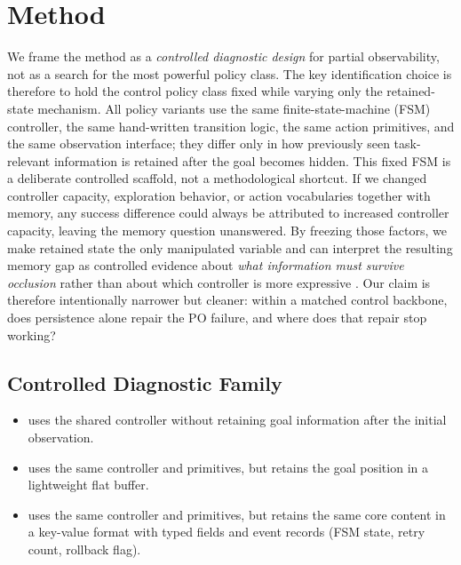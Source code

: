\section{Method}
\label{sec:method}

We frame the method as a \emph{controlled diagnostic design} for partial observability, not as a search for the most powerful policy class. The key identification choice is therefore to hold the control policy class fixed while varying only the retained-state mechanism. All policy variants use the same finite-state-machine (FSM) controller, the same hand-written transition logic, the same action primitives, and the same observation interface; they differ only in how previously seen task-relevant information is retained after the goal becomes hidden. This fixed FSM is a deliberate controlled scaffold, not a methodological shortcut. If we changed controller capacity, exploration behavior, or action vocabularies together with memory, any success difference could always be attributed to increased controller capacity, leaving the memory question unanswered. By freezing those factors, we make retained state the only manipulated variable and can interpret the resulting memory gap as controlled evidence about \emph{what information must survive occlusion} rather than about which controller is more expressive \citep{Kaelbling1998}. Our claim is therefore intentionally narrower but cleaner: within a matched control backbone, does persistence alone repair the PO failure, and where does that repair stop working?

\subsection{Controlled Diagnostic Family}

\begin{itemize}
\item {} uses the shared controller without retaining goal information after the initial observation.
\item {} uses the same controller and primitives, but retains the goal position in a lightweight flat buffer.
\item {} uses the same controller and primitives, but retains the same core content in a key-value format with typed fields and event records (FSM state, retry count, rollback flag).
\end{itemize}

